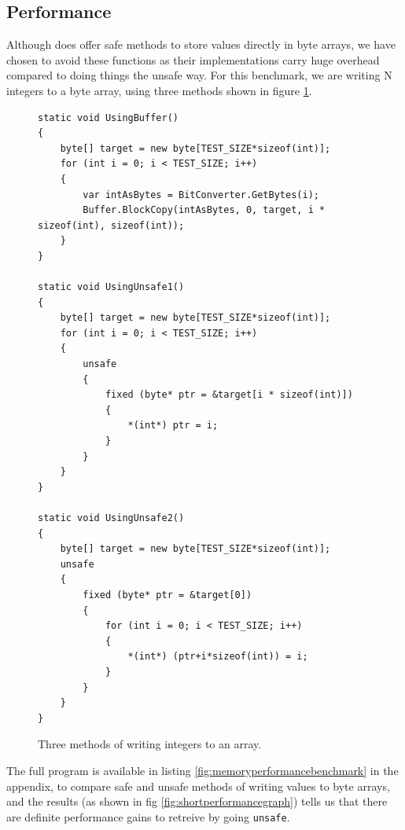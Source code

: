 \subsection{Performance}
\label{marshalunsafeperformance}
Although \csharp{} does offer safe methods to store values directly in byte
arrays, we have chosen to avoid these functions as their implementations carry
huge overhead compared to doing things the unsafe way.
For this benchmark, we are writing N integers to a byte array, using three
methods shown in figure \ref{fig:threemethods}.
\begin{figure}[H]
  \centering
  \begin{verbatim}
static void UsingBuffer()
{
    byte[] target = new byte[TEST_SIZE*sizeof(int)];
    for (int i = 0; i < TEST_SIZE; i++)
    {
        var intAsBytes = BitConverter.GetBytes(i);
        Buffer.BlockCopy(intAsBytes, 0, target, i * sizeof(int), sizeof(int)); 
    }
}

static void UsingUnsafe1()
{
    byte[] target = new byte[TEST_SIZE*sizeof(int)];
    for (int i = 0; i < TEST_SIZE; i++)
    {
        unsafe
        {
            fixed (byte* ptr = &target[i * sizeof(int)])
            {
                *(int*) ptr = i;
            }
        }
    }
}

static void UsingUnsafe2()
{
    byte[] target = new byte[TEST_SIZE*sizeof(int)];
    unsafe
    {
        fixed (byte* ptr = &target[0])
        {
            for (int i = 0; i < TEST_SIZE; i++)
            {
                *(int*) (ptr+i*sizeof(int)) = i;
            }
        }
    }
}

\end{verbatim}
  \caption{Three methods of writing integers to an array.}
  \label{fig:threemethods}
\end{figure}


The full program is available in listing \ref{fig:memoryperformancebenchmark} in the
appendix, to compare safe and unsafe methods of writing values to byte arrays, and the
results (as shown in fig \ref{fig:shortperformancegraph}) tells us that there
are definite performance gains to retreive by going \texttt{unsafe}.

